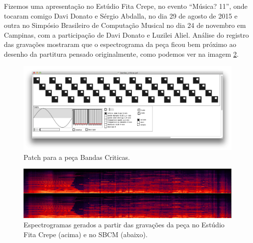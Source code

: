 Fizemos uma apresentação no Estúdio Fita Crepe, no evento ``Música? 11'', onde tocaram comigo Davi Donato e Sérgio Abdalla, no dia 29 de agosto de 2015 e outra no Simpósio Brasileiro de Computação Musical no dia 24 de novembro em Campinas, com a participação de Davi Donato e Luzilei Aliel. Análise do registro das gravações mostraram que o espectrograma da peça ficou bem próximo ao desenho da partitura pensado originalmente, como podemos ver na imagem \ref{bandasciticasspec}. 

\begin{figure}
    \caption{\label{bandaspatch}Patch para a peça Bandas Criticas. }
    \begin{center}
    \includegraphics[width=1\linewidth]{pictures/cap3/bandascriticaspd}
    \end{center}
\end{figure}

\begin{figure}
    \caption{\label{bandasciticasspec}Espectrogramas gerados a partir das gravações da peça no Estúdio Fita Crepe (acima) e no SBCM (abaixo). }
    \begin{center}
    \includegraphics[width=1\linewidth]{pictures/cap3/bandascriticasspectro2}
    \end{center}
\end{figure}



